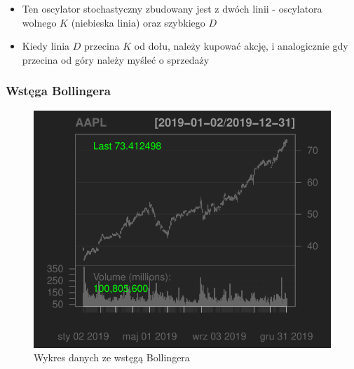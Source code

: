 \documentclass[12pt, a4paper]{article}\usepackage[]{graphicx}\usepackage[]{color}
\makeatletter
\def\maxwidth{ %
  \ifdim\Gin@nat@width>\linewidth
    \linewidth
  \else
    \Gin@nat@width
  \fi
}
\newenvironment{knitrout}{}{} %
\makeatother
\begin{document}
\begin{itemize}

\item Ten oscylator stochastyczny zbudowany jest z dwóch linii - oscylatora wolnego $K$ (niebieska linia) oraz szybkiego $D$

\item Kiedy linia $D$ przecina $K$ od dołu, należy kupować akcję, i analogicznie gdy przecina od góry należy myśleć o sprzedaży

\end{itemize}

\subsubsection{Wstęga Bollingera}

\begin{knitrout}
\color{fgcolor}\begin{figure}[H]

{\centering \includegraphics[width=\maxwidth]{figure/unnamed-chunk-5-1} 

}

\caption[Wykres danych ze wstęgą Bollingera]{Wykres danych ze wstęgą Bollingera}\label{fig:unnamed-chunk-5-1}
\end{figure}

\begin{figure}[H]


\end{figure}
\end{knitrout}
\end{document}
